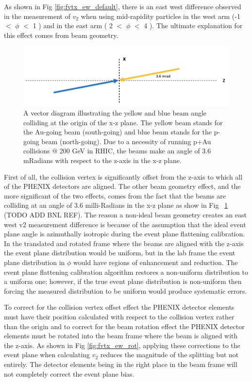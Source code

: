As shown in Fig \ref{fig:fvtx_ew_default}, there is an east west difference observed in the measurement of $v_2$ when using mid-rapidity particles in the west arm (-1 $<$ $\phi$ $<$ 1 ) and in the east arm ( 2 $<$ $\phi$ $<$ 4 ). The ultimate explanation for this effect comes from beam geometry. 

\begin{figure}[h!]
\begin{center}
\includegraphics[width=0.75\linewidth]{figs/beam_angle.png}
\caption{A vector diagram illustrating the yellow and blue beam angle colliding at the origin of the x-z plane. The yellow beam stands for the Au-going beam (south-going) and blue beam stands for the p-going beam (north-going). Due to a necessity of running p+Au collisions @ 200 GeV  in RHIC, the beams make an angle of 3.6 mRadians with respect to the z-axis in the x-z plane.}
\label{fig:diagram2}
\end{center}
\end{figure}

First of all, the collision vertex is significantly offset from the z-axis to which all of the PHENIX detectors are aligned. The other beam geometry effect, and the more significant of the two effects, comes from the fact that the beams are colliding at an angle of 3.6 milli-Radians in the x-z plane as show in Fig ~\ref{fig:diagram2} (TODO ADD BNL REF). The reason a non-ideal beam geometry creates an east west v2 measurement difference is because of the assumption that the ideal event plane angle is azimuthally isotropic during the event plane flattening calibration. In the translated and rotated frame where the beams are aligned with the z-axis the event plane distribution would be uniform, but in the lab frame the event plane distribution in $\phi$ would have regions of enhancement and reduction. The event plane flattening calibration algorithm restores a non-uniform distribution to a uniform one; however, if the true event plane distribution is non-uniform then forcing the measured distribution to be uniform would produce systematic errors.

To correct for the collision vertex offset effect the PHENIX detector elements must have their position calculated with respect to the collision vertex rather than the origin and to correct for the beam rotation effect the PHENIX detector elements must be rotated into the beam frame where the beam is aligned with the z-axis. As shown in Fig \ref{fig:fvtx_ew_rot}, applying these corrections to the event plane when calculating $v_2$ reduces the magnitude of the splitting but not entirely. The detector elements being in the right place in the beam frame will not completely correct the event plane bias.

